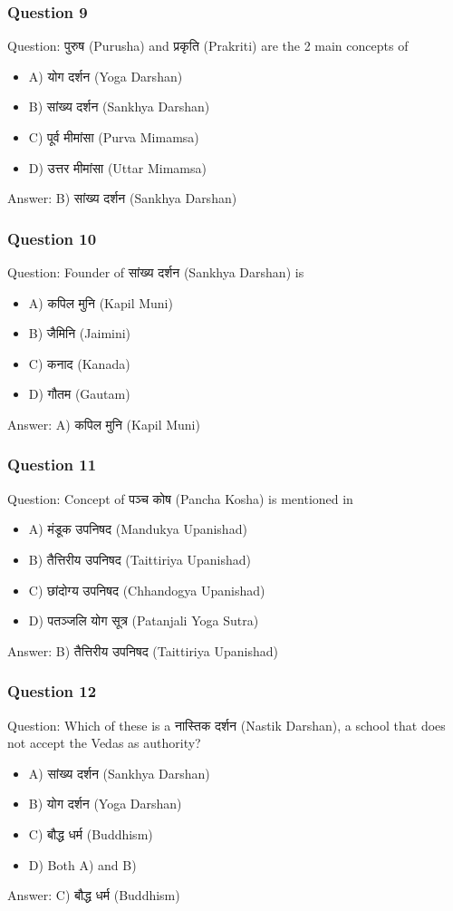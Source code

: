 \begin{frame}[fragile]\frametitle{Question 9}
Question: पुरुष (Purusha) and प्रकृति (Prakriti) are the 2 main concepts of
\begin{itemize}
\item A) योग दर्शन (Yoga Darshan)
\item B) सांख्य दर्शन (Sankhya Darshan)
\item C) पूर्व मीमांसा (Purva Mimamsa)
\item D) उत्तर मीमांसा (Uttar Mimamsa)
\end{itemize}
Answer: B) सांख्य दर्शन (Sankhya Darshan)
\end{frame}

\begin{frame}[fragile]\frametitle{Question 10}
Question: Founder of सांख्य दर्शन (Sankhya Darshan) is
\begin{itemize}
\item A) कपिल मुनि (Kapil Muni)
\item B) जैमिनि (Jaimini)
\item C) कनाद (Kanada)
\item D) गौतम (Gautam)
\end{itemize}
Answer: A) कपिल मुनि (Kapil Muni)
\end{frame}

\begin{frame}[fragile]\frametitle{Question 11}
Question: Concept of पञ्च कोष (Pancha Kosha) is mentioned in
\begin{itemize}
\item A) मंडूक उपनिषद (Mandukya Upanishad)
\item B) तैत्तिरीय उपनिषद (Taittiriya Upanishad)
\item C) छांदोग्य उपनिषद (Chhandogya Upanishad)
\item D) पतञ्जलि योग सूत्र (Patanjali Yoga Sutra)
\end{itemize}
Answer: B) तैत्तिरीय उपनिषद (Taittiriya Upanishad)
\end{frame}

\begin{frame}[fragile]\frametitle{Question 12}
Question: Which of these is a नास्तिक दर्शन (Nastik Darshan), a school that does not accept the Vedas as authority?
\begin{itemize}
\item A) सांख्य दर्शन (Sankhya Darshan)
\item B) योग दर्शन (Yoga Darshan)
\item C) बौद्ध धर्म (Buddhism)
\item D) Both A) and B)
\end{itemize}
Answer: C) बौद्ध धर्म (Buddhism)
\end{frame}

